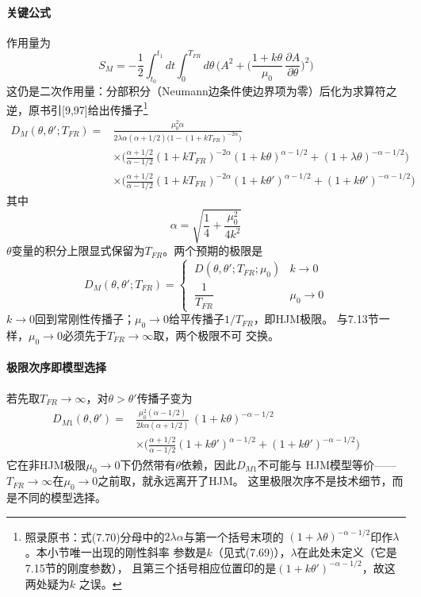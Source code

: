 \paragraph{关键公式}
作用量为
\begin{equation*}
S_{M}=-\frac{1}{2}\int_{t_{0}}^{t_{1}}dt\int_{0}^{T_{FR}}d\theta\,
\Biggl(A^{2}+\biggl(\frac{1+k\theta}{\mu_{0}}\,\frac{\partial A}{\partial\theta}
\biggr)^{2}\Biggr)
\tag{7.69}
\end{equation*}
这仍是二次作用量：分部积分（Neumann边条件使边界项为零）后化为求算符之
逆，原书引[9,97]给出传播子\footnote{照录原书：式(7.70)分母中的$2\lambda\alpha$与第一个括号末项的
$(1+\lambda\theta)^{-\alpha-1/2}$印作$\lambda$。本小节唯一出现的刚性斜率
参数是$k$（见式(7.69)），$\lambda$在此处未定义（它是7.15节的刚度参数），
且第三个括号相应位置印的是$(1+k\theta')^{-\alpha-1/2}$，故这两处疑为$k$
之误。}
\begin{equation*}
\begin{aligned}
D_{M}(\theta,\theta';T_{FR})={}&
\frac{\mu_{0}^{2}\alpha}{2\lambda\alpha(\alpha+1/2)\bigl(1-(1+kT_{FR})^{-2\alpha}\bigr)}\\
&\times\Biggl(\frac{\alpha+1/2}{\alpha-1/2}(1+kT_{FR})^{-2\alpha}
(1+k\theta)^{\alpha-1/2}+(1+\lambda\theta)^{-\alpha-1/2}\Biggr)\\
&\times\Biggl(\frac{\alpha+1/2}{\alpha-1/2}(1+kT_{FR})^{-2\alpha}
(1+k\theta')^{\alpha-1/2}+(1+k\theta')^{-\alpha-1/2}\Biggr)
\end{aligned}
\tag{7.70}
\end{equation*}其中
\begin{equation*}
\alpha=\sqrt{\frac{1}{4}+\frac{\mu_{0}^{2}}{4k^{2}}}
\end{equation*}
$\theta$变量的积分上限显式保留为$T_{FR}$。两个预期的极限是
\begin{equation*}
D_{M}(\theta,\theta';T_{FR})=
\begin{cases}
\ D(\theta,\theta';T_{FR};\mu_{0}) & k\to0\\[4pt]
\ \dfrac{1}{T_{FR}} & \mu_{0}\to0
\end{cases}
\tag{7.71a}
\end{equation*}
$k\to0$回到常刚性传播子；$\mu_{0}\to0$给平传播子$1/T_{FR}$，即HJM极限。
与7.13节一样，$\mu_{0}\to0$必须先于$T_{FR}\to\infty$取，两个极限不可
交换。

\paragraph{极限次序即模型选择}
若先取$T_{FR}\to\infty$，对$\theta>\theta'$传播子变为
\begin{equation*}
\begin{aligned}
D_{M1}(\theta,\theta')={}&
\frac{\mu_{0}^{2}(\alpha-1/2)}{2k\alpha(\alpha+1/2)}\,(1+k\theta)^{-\alpha-1/2}\\
&\times\Biggl(\frac{\alpha+1/2}{\alpha-1/2}(1+k\theta')^{\alpha-1/2}
+(1+k\theta')^{-\alpha-1/2}\Biggr)
\end{aligned}
\tag{7.72}
\end{equation*}
它在非HJM极限$\mu_{0}\to0$下仍然带有$\theta$依赖，因此$D_{M1}$不可能与
HJM模型等价——$T_{FR}\to\infty$在$\mu_{0}\to0$之前取，就永远离开了HJM。
这里极限次序不是技术细节，而是不同的模型选择。

